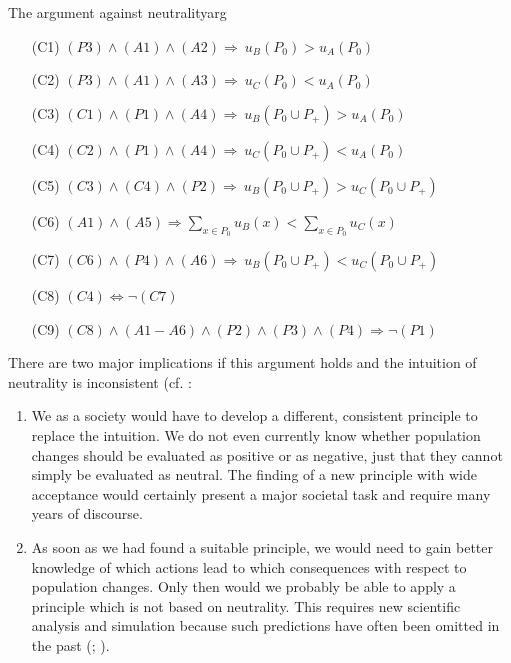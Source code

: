 \begin{Proof}{The argument against neutrality}{arg}
\begin{enumerate}
\item[(C1)] \hspace{1cm}
$(P3) \wedge (A1) \wedge (A2) \Rightarrow \ u_B(P_0) > u_A(P_0)$
\item[(C2)] \hspace{1cm}
$(P3) \wedge (A1) \wedge (A3) \Rightarrow \ u_C(P_0) < u_A(P_0)$
\item[(C3)] \hspace{1cm}
$(C1) \wedge (P1) \wedge (A4) \Rightarrow \ u_B(P_0 \cup P_+) > u_A(P_0)$
\item[(C4)] \hspace{1cm}
$(C2) \wedge (P1) \wedge (A4) \Rightarrow \ u_C(P_0 \cup P_+) < u_A(P_0)$
\item[(C5)] \hspace{1cm}
$(C3) \wedge (C4) \wedge (P2) \Rightarrow \ u_B(P_0 \cup P_+) > u_C(P_0 \cup P_+)$
\item[(C6)] \hspace{1cm}
$(A1) \wedge (A5) \Rightarrow \sum_{x\in P_0} u_B(x) < \sum_{x \in P_0} u_C(x)$
\item[(C7)] \hspace{1cm}
$(C6) \wedge (P4) \wedge (A6) \Rightarrow  \ u_B(P_0 \cup P_+) < u_C(P_0 \cup P_+)$
\item[(C8)] \hspace{1cm}
$(C4) \Leftrightarrow \neg (C7)$
\item[(C9)] \hspace{1cm}
$(C8) \wedge (A1-A6) \wedge (P2) \wedge (P3) \wedge (P4) \Rightarrow \neg (P1)$
\end{enumerate}
\end{Proof}

There are two major implications if this argument holds and the intuition of neutrality is inconsistent (cf. : 

\begin{enumerate}
\item We as a society would have to develop a different, consistent principle to replace the intuition. We do not even currently know whether population changes should be evaluated as positive or as negative, just that they cannot simply be evaluated as neutral. The finding of a new principle with wide acceptance would certainly present a major societal task and require many years of discourse. 
\item As soon as we had found a suitable principle, we would need to gain better knowledge of which actions lead to which consequences with respect to population changes. Only then would we probably be able to apply a principle which is not based on neutrality. This requires new scientific analysis and simulation because such predictions have often been omitted in the past (; ). 
\end{enumerate}

